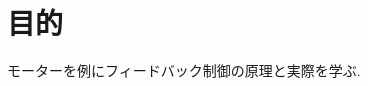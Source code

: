 \documentclass[../../../main]{subfiles}
\begin{document}
\section{目的}\label{sec:intro}
モーターを例にフィードバック制御の原理と実際を学ぶ.
\end{document}
